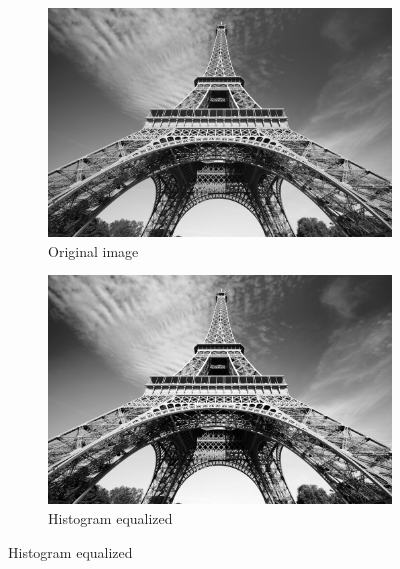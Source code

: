 \documentclass[12pt]{article}
\begin{document}
\begin{figure}[H]
  \centering
  \begin{subfigure}{.45\textwidth}
    \includegraphics[width=\linewidth]{./img/in.jpg}
    \caption{Original image}
  \end{subfigure}
  \hspace{1cm}
  \begin{subfigure}{.45\textwidth}
    \includegraphics[width=\linewidth]{./img/out.jpg}
    \caption{Histogram equalized}
  \end{subfigure}
\end{figure}
\end{document}
